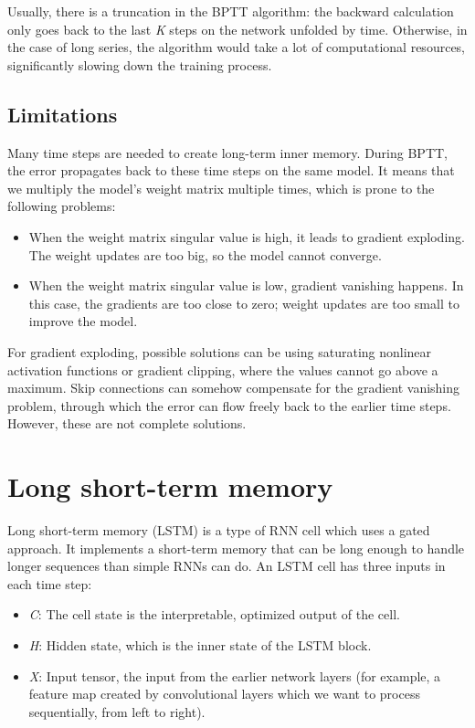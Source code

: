 Usually, there is a truncation in the BPTT algorithm: the backward calculation only goes back to the last \textit{K} steps on the network unfolded by time. Otherwise, in the case of long series, the algorithm would take a lot of computational resources, significantly slowing down the training process.

\subsection{Limitations}

Many time steps are needed to create long-term inner memory. During BPTT, the error propagates back to these time steps on the same model. It means that we multiply the model's weight matrix multiple times, which is prone to the following problems:

\begin{itemize}
\item When the weight matrix singular value is high, it leads to gradient exploding. The weight updates are too big, so the model cannot converge.
\item When the weight matrix singular value is low, gradient vanishing happens. In this case, the gradients are too close to zero; weight updates are too small to improve the model.
\end{itemize}

For gradient exploding, possible solutions can be using saturating nonlinear activation functions or gradient clipping, where the values cannot go above a maximum. Skip connections can somehow compensate for the gradient vanishing problem, through which the error can flow freely back to the earlier time steps. However, these are not complete solutions.

\section{Long short-term memory}

Long short-term memory\cite{LSTM} (LSTM) is a type of RNN cell which uses a gated approach. It implements a short-term memory that can be long enough to handle longer sequences than simple RNNs can do. An LSTM cell has three inputs in each time step:

\begin{itemize}
\item \textit{C}: The cell state is the interpretable, optimized output of the cell.
\item \textit{H}: Hidden state, which is the inner state of the LSTM block.
\item \textit{X}: Input tensor, the input from the earlier network layers (for example, a feature map created by convolutional layers which we want to process sequentially, from left to right).
\end{itemize}

